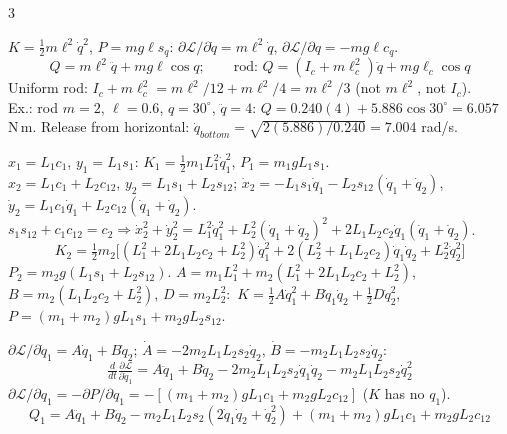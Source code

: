 \begin{multicols}{3}
\nopagebreak
\begin{deriv}
$K=\tfrac12m\ell^2\dot q^2$, $P=mg\ell s_q$: $\partial\mathcal L/\partial\dot q=m\ell^2\dot q$, $\partial\mathcal L/\partial q=-mg\ell c_q$.
\[Q=m\ell^2\ddot q+mg\ell\cos q;\qquad\text{rod: }Q=(I_c+m\ell_c^2)\ddot q+mg\ell_c\cos q\]
Uniform rod: $I_c+m\ell_c^2=m\ell^2/12+m\ell^2/4=m\ell^2/3$ (not $m\ell^2$, not $I_c$).\\
Ex.: rod $m=2$, $\ell=0.6$, $q=30^\circ$, $\ddot q=4$: $Q=0.240(4)+5.886\cos30^\circ=6.057$ N\,m. Release from horizontal: $\dot q_{bottom}=\sqrt{2(5.886)/0.240}=7.004$ rad/s. \chk
\end{deriv}

\begin{deriv}[1. energies \pg{19--22}]
$x_1=L_1c_1$, $y_1=L_1s_1$: $K_1=\tfrac12m_1L_1^2\dot q_1^2$, $P_1=m_1gL_1s_1$.\\
$x_2=L_1c_1+L_2c_{12}$, $y_2=L_1s_1+L_2s_{12}$;
$\dot x_2=-L_1s_1\dot q_1-L_2s_{12}(\dot q_1{+}\dot q_2)$, $\dot y_2=L_1c_1\dot q_1+L_2c_{12}(\dot q_1{+}\dot q_2)$.\\
$s_1s_{12}+c_1c_{12}=c_2\Rightarrow\dot x_2^2+\dot y_2^2=L_1^2\dot q_1^2+L_2^2(\dot q_1{+}\dot q_2)^2+2L_1L_2c_2\dot q_1(\dot q_1{+}\dot q_2)$.
\[K_2=\tfrac12m_2\big[(L_1^2{+}2L_1L_2c_2{+}L_2^2)\dot q_1^2+2(L_2^2{+}L_1L_2c_2)\dot q_1\dot q_2+L_2^2\dot q_2^2\big]\]
$P_2=m_2g(L_1s_1{+}L_2s_{12})$.
$A=m_1L_1^2+m_2(L_1^2{+}2L_1L_2c_2{+}L_2^2)$, $B=m_2(L_1L_2c_2{+}L_2^2)$, $D=m_2L_2^2$:\ 
$K=\tfrac12A\dot q_1^2+B\dot q_1\dot q_2+\tfrac12D\dot q_2^2$, $P=(m_1{+}m_2)gL_1s_1+m_2gL_2s_{12}$.
\end{deriv}
\begin{deriv}
$\partial\mathcal L/\partial\dot q_1=A\dot q_1+B\dot q_2$; $\dot A=-2m_2L_1L_2s_2\dot q_2$, $\dot B=-m_2L_1L_2s_2\dot q_2$:
\[\tfrac d{dt}\tfrac{\partial\mathcal L}{\partial\dot q_1}=A\ddot q_1+B\ddot q_2-2m_2L_1L_2s_2\dot q_1\dot q_2-m_2L_1L_2s_2\dot q_2^2\]
$\partial\mathcal L/\partial q_1=-\partial P/\partial q_1=-[(m_1{+}m_2)gL_1c_1+m_2gL_2c_{12}]$ ($K$ has no $q_1$).
\[Q_1=A\ddot q_1+B\ddot q_2-m_2L_1L_2s_2(2\dot q_1\dot q_2+\dot q_2^2)+(m_1{+}m_2)gL_1c_1+m_2gL_2c_{12}\]

\end{deriv}
\end{multicols}
